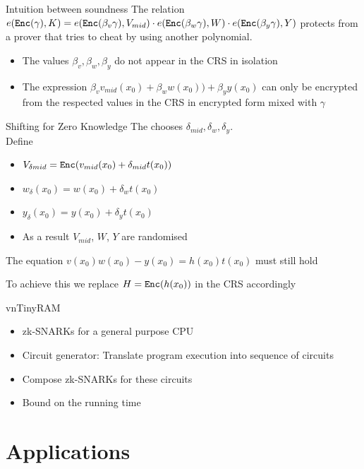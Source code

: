 \documentclass[handout]{beamer}
\begin{document}
\begin{frame}{Intuition between soundness}
The relation 
$e(\mathtt{Enc}(\gamma),K) = e(\mathtt{Enc}(\beta_v \gamma),V_{mid}) \cdot e(\mathtt{Enc}(\beta_w \gamma),W) \cdot e(\mathtt{Enc}(\beta_y \gamma),Y)$
protects from a prover that tries to cheat by using another polynomial.
\begin{itemize}
    \item The values $\beta_v, \beta_w, \beta_y$ do not appear in the CRS in isolation
    \item The expression $\beta_v v_{mid}(x_0) + \beta_w w(x_0))+\beta_y y(x_0) $ can only be encrypted from the respected values in the CRS in encrypted form mixed with $\gamma$
\end{itemize}
\end{frame}

\begin{frame}{Shifting for Zero Knowledge}
The \prv chooses $\delta_{mid}, \delta_w, \delta_y$. \\
Define 
\begin{itemize}
\item $V_{\delta{mid}} = \mathtt{Enc}(v_{mid}(x_0)+\delta_{mid}t(x_0))$
\item $w_{\delta}(x_0) = w(x_0)+\delta_w t(x_0)$
\item $y_{\delta}(x_0) = y(x_0)+\delta_y t(x_0)$
\item As a result $V_{mid}$, $W$, $Y$ are randomised
\end{itemize}
The equation $v(x_0)w(x_0)-y(x_0)= h(x_0)t(x_0)$ must still hold

To achieve this we replace $H = \mathtt{Enc}(h(x_0))$ in the CRS accordingly

\end{frame}

\begin{frame}{vnTinyRAM}
\begin{itemize}
    \item zk-SNARKs for a general purpose CPU
    \item Circuit generator: Translate program execution into sequence of circuits
    \item Compose zk-SNARKs for these circuits
    \item Bound on the running time
\end{itemize}
\end{frame}

\section{Applications}
\end{document}
